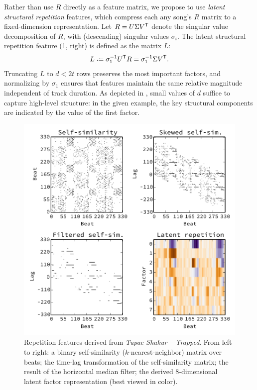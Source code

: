\documentclass{article}
\begin{document}
Rather than use $R$ directly as a feature matrix, we propose to use \emph{latent structural repetition} features, which compress each
any song's $R$ matrix to a fixed-dimension representation.  Let $R = U\Sigma V^\mathsf{T}$ denote the singular value decomposition of $R$,
with (descending) singular values $\sigma_i$. The latent structural repetition feature (\cref{fig:rep}, right) is defined as the 
matrix $L$:
\[
L \defeq \sigma_1^{-1} U\trans R = \sigma_1^{-1} \Sigma V\trans.
\]
Truncating $L$ to $d < 2t$ rows preserves the most important factors, and normalizing by $\sigma_1$ ensures that
features maintain the same relative magnitude independent of track duration.  As depicted in , small values of $d$
suffice to capture high-level structure: in the given example, the key structural components are indicated by the value of the first
factor.

\begin{figure}[t]
\centering%
\includegraphics[width=\textwidth]{figs/rep}
\vspace{-2\baselineskip}
\caption{Repetition features derived from \emph{Tupac Shakur -- Trapped}. 
From left to right: a binary self-similarity ($k$-nearest-neighbor) 
matrix over beats; 
the time-lag transformation of the self-similarity matrix; 
the result of the horizontal median filter;
the derived 8-dimensional latent factor representation (best viewed in color).\label{fig:rep}}
\end{figure}
\end{document}
